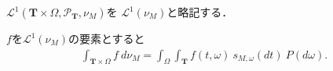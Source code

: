 	$\mathscr{L}^1(\mathbf{T} \times \Omega,\mathscr{P}_{\mathbf{T}},\nu_M)$を
	$\mathscr{L}^1(\nu_M)$と略記する．
	
	\begin{screen}
		\begin{thm}[可積分可予測過程の積分表現]
			$f$を$\mathscr{L}^1(\nu_M)$の要素とすると
			\begin{align}
				\int_{\mathbf{T} \times \Omega} f\ d\nu_M 
				= \int_\Omega \int_{\mathbf{T}} f(t,\omega)\ s_{M,\omega}(dt)\ P(d\omega).
			\end{align}
		\end{thm}
	\end{screen}
	
	\begin{sketch}
		
	\end{sketch}
	
	\begin{comment}
	いま，$\mathscr{P}_{\mathbf{T}}$の要素に対する定義関数の全体の線型包を$\mathscr{S}$と定める:
	\begin{align}
		\mathscr{S} \defeq \operatorname{Span}\Set{\defunc_A}{A \in \mathscr{P}_{\mathbf{T}}}.
	\end{align}
	このとき$\mathscr{S}$は$\mathscr{L}^2(\nu_M)$において，セミノルム$\Norm{\cdot}{\mathscr{L}^2(\nu_M)}$に関して稠密となる．
	
	\begin{screen}
		\begin{thm}
			
		\end{thm}
	\end{screen}
	\end{comment}